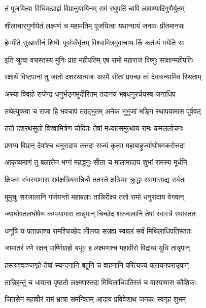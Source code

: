 \twolineshloka
{तं पूजयित्वा विधिवत्प्राज्ञं विप्रानुयायिनम्}
{रामं रघुपतिं चापि लावण्यादिगुणैर्युतम्} %

\twolineshloka
{शीलाचारगुणोपेतं लक्ष्मणं च महामतिम्}
{पूजयित्वा यथान्यायं जनकः प्रीतमानसः} %

\twolineshloka
{हेमपीठे सुखासीनं शिष्यैः पूर्वापरैर्वृतम्}
{विश्वामित्रमुवाचाथ किं कर्तव्यं मयेति सः} %


\twolineshloka
{इति श्रुत्वा वचस्तस्य मुनिः प्राह महीपतिम्}
{एष रामो महाराज विष्णुः साक्षान्महीपतिः} %

\twolineshloka
{रक्षार्थं विष्टपानां तु जातो दशरथात्मजः}
{अस्मै सीतां प्रयच्छ त्वं देवकन्यामिव स्थिताम्} %

\twolineshloka
{अस्या विवाहे राजेन्द्र धनुर्भङ्गमुदीरितम्}
{तदानय भवधनुरर्चयस्व जनाधिप} %

\twolineshloka
{तथेत्युक्त्वा च राजा हि भवचापं तदद्भुतम्}
{अनेक भूभुजां भङ्गि स्थापयामास पूर्ववत्} %

\twolineshloka
{ततो दशरथसुतो विश्वामित्रेण चोदितः}
{तेषां मध्यात्समुत्थाय रामः कमललोचनः} %

\twolineshloka
{प्रणम्य विप्रान् देवांश्च धनुरादाय तत्तदा}
{सज्यं कृत्वा महाबाहुर्ज्याघोषमकरोत्तदा} %

\twolineshloka
{आकृष्यमाणं तु बलात्तेन भग्नं महद्धनुः}
{सीता च मालामादाय शुभां रामस्य मूर्धनि} %

\twolineshloka
{क्षिप्त्वा संवरयामास सर्वक्षत्रियसन्निधौ}
{ततस्ते क्षत्रियाः क्रुद्धा राममासाद्य सर्वतः} %

\twolineshloka
{मुमुचुः शरजालानि गर्जयन्तो महाबलाः}
{तान्निरीक्ष्य ततो रामो धनुरादाय वेगवान्} %

\twolineshloka
{ज्याघोषतलघोषेण कम्पयामास तान्नृपान्}
{चिच्छेद शरजालानि तेषां स्वास्त्रै रथांस्ततः} %

\twolineshloka
{धनूंषि च पताकाश्च रामश्चिच्छेद लीलया}
{सन्नह्य स्वबलं सर्वं मिथिलाधिपतिस्ततः} %

\twolineshloka
{जामातरं रणे रक्षन् पार्ष्णिग्राहो बभूव ह}
{लक्ष्मणश्च महावीरो विद्राव्य युधि तान्नृपान्} %

\twolineshloka
{हस्त्यश्वाञ्जगृहे तेषां स्यन्दनानि बहूनि च}
{वाहनानि परित्यज्य पलायनपरान्नृपान्} %

\twolineshloka
{तान्निहन्तुं च धावत्स पृष्ठतो लक्ष्मणस्तदा}
{मिथिलाधिपतिस्तं च वारयामास कौशिकः} %

\twolineshloka
{जितसेनं महावीरं रामं भ्रात्रा समन्वितम्}
{आदाय प्रविवेशाथ जनकः स्वगृहं शुभम्} %

